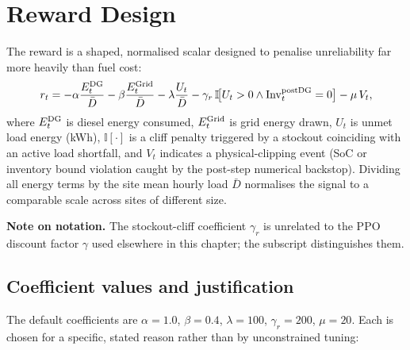 \section{Reward Design}
\label{sec:reward_design}

The reward is a shaped, normalised scalar designed to penalise
unreliability far more heavily than fuel cost:
\[
r_t =
-\alpha \dfrac{E_t^{\mathrm{DG}}}{\bar{D}}
-\beta  \dfrac{E_t^{\mathrm{Grid}}}{\bar{D}}
-\lambda \dfrac{U_t}{\bar{D}}
-\gamma_r\,\mathbb{I}\!\bigl[U_t>0 \wedge \mathrm{Inv}_t^{\mathrm{postDG}}=0\bigr]
-\mu\,V_t,
\]
where $E_t^{\mathrm{DG}}$ is diesel energy consumed, $E_t^{\mathrm{Grid}}$ is grid energy
drawn, $U_t$ is unmet load energy (kWh), $\mathbb{I}[\cdot]$ is a cliff
penalty triggered by a stockout coinciding with an active load shortfall,
and $V_t$ indicates a physical-clipping event (SoC or inventory bound
violation caught by the post-step numerical backstop). Dividing all
energy terms by the site mean hourly load $\bar{D}$ normalises the signal
to a comparable scale across sites of different size. 


\textbf{Note on notation.} The stockout-cliff coefficient $\gamma_r$ is
unrelated to the PPO discount factor $\gamma$ used elsewhere in this
chapter; the subscript distinguishes them.

\subsection{Coefficient values and justification}

The default coefficients are $\alpha=1.0$, $\beta=0.4$, $\lambda=100$,
$\gamma_r=200$, $\mu=20$. Each is chosen for a specific, stated reason
rather than by unconstrained tuning:

